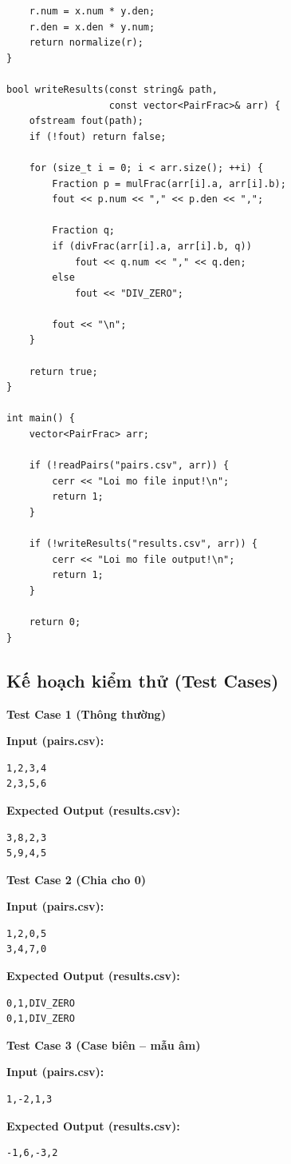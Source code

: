 \begin{lstlisting}
    r.num = x.num * y.den;
    r.den = x.den * y.num;
    return normalize(r);
}

bool writeResults(const string& path,
                  const vector<PairFrac>& arr) {
    ofstream fout(path);
    if (!fout) return false;

    for (size_t i = 0; i < arr.size(); ++i) {
        Fraction p = mulFrac(arr[i].a, arr[i].b);
        fout << p.num << "," << p.den << ",";

        Fraction q;
        if (divFrac(arr[i].a, arr[i].b, q))
            fout << q.num << "," << q.den;
        else
            fout << "DIV_ZERO";

        fout << "\n";
    }

    return true;
}

int main() {
    vector<PairFrac> arr;

    if (!readPairs("pairs.csv", arr)) {
        cerr << "Loi mo file input!\n";
        return 1;
    }

    if (!writeResults("results.csv", arr)) {
        cerr << "Loi mo file output!\n";
        return 1;
    }

    return 0;
}
\end{lstlisting}

\subsection{Kế hoạch kiểm thử (Test Cases)}

\textbf{Test Case 1 (Thông thường)}

\textbf{Input (pairs.csv):}
\begin{lstlisting}
1,2,3,4
2,3,5,6
\end{lstlisting}

\textbf{Expected Output (results.csv):}
\begin{lstlisting}
3,8,2,3
5,9,4,5
\end{lstlisting}

\vspace{0.5cm}

\textbf{Test Case 2 (Chia cho 0)}

\textbf{Input (pairs.csv):}
\begin{lstlisting}
1,2,0,5
3,4,7,0
\end{lstlisting}

\textbf{Expected Output (results.csv):}
\begin{lstlisting}
0,1,DIV_ZERO
0,1,DIV_ZERO
\end{lstlisting}

\vspace{0.5cm}

\textbf{Test Case 3 (Case biên -- mẫu âm)}

\textbf{Input (pairs.csv):}
\begin{lstlisting}
1,-2,1,3
\end{lstlisting}

\textbf{Expected Output (results.csv):}
\begin{lstlisting}
-1,6,-3,2
\end{lstlisting}